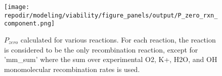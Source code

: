 \begin{figure}[h]
    \centering
    \texttt{[image: \\repodir/modeling/viability/figure\_panels/output/P\_zero\_rxn\_component.png]} 
    \caption{$P_{zero}$ calculated for various reactions. For each reaction, the reaction is considered to be the only recombination reaction, except for 'mm\_sum' where the sum over experimental O2, K+, H2O, and OH monomolecular recombination rates is used.}
    \label{fig:SI_P_zero_rxn_component}
\end{figure}




